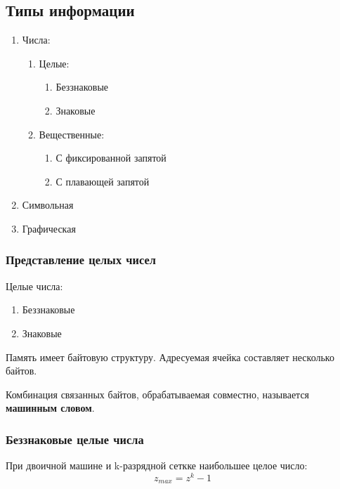 \subsection{Типы информации}

\begin{enumerate}
  \item Числа:
    \begin{enumerate}
      \item Целые:
        \begin{enumerate}
          \item Беззнаковые
          \item Знаковые
        \end{enumerate}
      \item Вещественные:
        \begin{enumerate}
          \item С фиксированной запятой
          \item С плавающей запятой
        \end{enumerate}
    \end{enumerate}
  \item Символьная 
  \item Графическая
\end{enumerate}

\subsubsection{Представление целых чисел}

Целые числа:
\begin{enumerate}
  \item Беззнаковые
  \item Знаковые
\end{enumerate}

Память имеет байтовую структуру. Адресуемая ячейка составляет несколько байтов.

\begin{definition}
  Комбинация связанных байтов, обрабатываемая совместно, называется \textbf{машинным словом}.
\end{definition}

\subsubsection{Беззнаковые целые числа}

При двоичной машине и k-разрядной сеткке наибольшее целое число: \[
  z_{max} = z^{k} - 1
\] 

